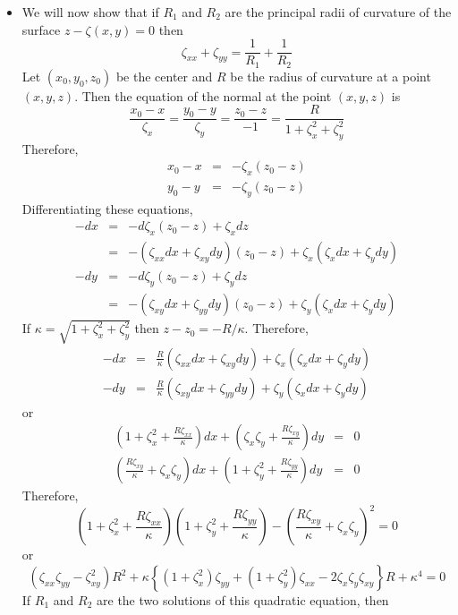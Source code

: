 \begin{itemize}
\item We will now show that if $R_1$ and $R_2$ are the principal radii of curvature of the surface $z - \zeta(x, y) = 0$ then
\begin{equation}\label{c1s7e2}
\zeta_{xx} + \zeta_{yy} = \frac{1}{R_1} + \frac{1}{R_2}
\end{equation}
Let $(x_0, y_0, z_0)$ be the center and $R$ be the radius of curvature at a point $(x, y, z)$. Then the equation of the normal at the point $(x, y, z)$ is\cite{smith1891elementary} 
\[
\frac{x_0 - x}{\zeta_x} = \frac{y_0 - y}{\zeta_y} = \frac{z_0 - z}{-1} = \frac{R}{1 + \zeta_x^2 + \zeta_y^2}
\]
Therefore,
\begin{eqnarray*}
x_0 - x &=& -\zeta_x(z_0 - z) \\
y_0 - y &=& -\zeta_y(z_0 - z)
\end{eqnarray*}
Differentiating these equations,
\begin{eqnarray*}
-dx &=& -d\zeta_x (z_0 - z) + \zeta_x dz \\
 &=& -(\zeta_{xx}dx + \zeta_{xy}dy)(z_0 - z) + \zeta_x(\zeta_x dx + \zeta_y dy) \\
-dy &=&  -d\zeta_y (z_0 - z) + \zeta_y dz \\
 &=& -(\zeta_{xy}dx + \zeta_{yy}dy)(z_0 - z) + \zeta_y(\zeta_x dx + \zeta_y dy) 
\end{eqnarray*}
If $\kappa = \sqrt{1 + \zeta_x^2 + \zeta_y^2}$ then $z - z_0 = -R/\kappa$. Therefore,
\begin{eqnarray*}
-dx &=& \frac{R}{\kappa}(\zeta_{xx}dx + \zeta_{xy}dy) + \zeta_x(\zeta_x dx + \zeta_y dy) \\
-dy &=& \frac{R}{\kappa}(\zeta_{xy}dx + \zeta_{yy}dy) + \zeta_y(\zeta_x dx + \zeta_y dy) 
\end{eqnarray*}
or
\begin{eqnarray*}
\left(1 + \zeta_x^2 + \frac{R\zeta_{xx}}{\kappa}\right)dx + \left(\zeta_x\zeta_y + \frac{R\zeta_{xy}}{\kappa}\right)dy &=& 0 \\
\left(\frac{R\zeta_{xy}}{\kappa} + \zeta_x\zeta_y\right)dx + \left(1 + \zeta_y^2 + \frac{R\zeta_{yy}}{\kappa}\right)dy &=& 0
\end{eqnarray*}
Therefore,
\[
\left(1 + \zeta_x^2 + \frac{R\zeta_{xx}}{\kappa}\right)\left(1 + \zeta_y^2 + \frac{R\zeta_{yy}}{\kappa}\right) - \left(\frac{R\zeta_{xy}}{\kappa} + \zeta_x\zeta_y\right)^2 = 0
\]
or
\[
\left(\zeta_{xx}\zeta_{yy} - \zeta_{xy}^2\right)R^2 + \kappa\left\{(1+\zeta_x^2)\zeta_{yy} + (1+\zeta_y^2)\zeta_{xx} - 2\zeta_x\zeta_y\zeta_{xy}\right\}R + \kappa^4 = 0
\]
If $R_1$ and $R_2$ are the two solutions of this quadratic equation, then

\end{itemize}
